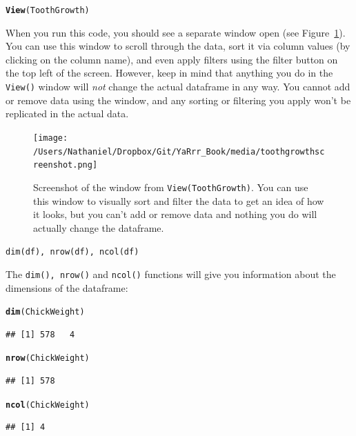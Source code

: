 \documentclass{tufte-book}\usepackage[]{graphicx}\usepackage[]{color}
\makeatletter
\newcommand{\hlstd}[1]{\textcolor[rgb]{0.345,0.345,0.345}{#1}}%
\newcommand{\hlkwd}[1]{\textcolor[rgb]{0.737,0.353,0.396}{\textbf{#1}}}%
\newenvironment{kframe}{%
 \def\at@end@of@kframe{}%
 \ifinner\ifhmode%
  \def\at@end@of@kframe{\end{minipage}}%
  \begin{minipage}{\columnwidth}%
 \fi\fi%
 \def\FrameCommand##1{\hskip\@totalleftmargin \hskip-\fboxsep
 \colorbox{shadecolor}{##1}\hskip-\fboxsep
     \hskip-\linewidth \hskip-\@totalleftmargin \hskip\columnwidth}%
 \MakeFramed {\advance\hsize-\width
   \@totalleftmargin\z@ \linewidth\hsize
   \@setminipage}}%
 {\par\unskip\endMakeFramed%
 \at@end@of@kframe}
\newenvironment{knitrout}{}{} %
\newcommand{\newfun}[1]{\begin{LARGE} \begin{center} \texttt{#1} \end{center} \end{LARGE}}
\makeatother
\begin{document}
\begin{knitrout}
\color{fgcolor}\begin{kframe}
\begin{alltt}
\hlkwd{View}\hlstd{(ToothGrowth)}
\end{alltt}
\end{kframe}
\end{knitrout}

When you run this code, you should see a separate window open (see Figure~\ref{fig:toothgrowthscreenshot}). You can use this window to scroll through the data, sort it via column values (by clicking on the column name), and even apply filters using the filter button on the top left of the screen. However, keep in mind that anything you do in the \texttt{View()} window will \textit{not} change the actual dataframe in any way. You cannot add or remove data using the window, and any sorting or filtering you apply won't be replicated in the actual data.

\begin{figure}[h]
\texttt{[image: /Users/Nathaniel/Dropbox/Git/YaRrr\_Book/media/toothgrowthscreenshot.png]}
\label{fig:toothgrowthscreenshot}
\caption{Screenshot of the window from \texttt{View(ToothGrowth)}. You can use this window to visually sort and filter the data to get an idea of how it looks, but you can't add or remove data and nothing you do will actually change the dataframe.}
\end{figure}


\newfun{dim(df), nrow(df), ncol(df)}

The \texttt{dim(), nrow()} and \texttt{ncol()} functions will give you information about the dimensions of the dataframe:
\begin{knitrout}
\color{fgcolor}\begin{kframe}
\begin{alltt}
\hlkwd{dim}\hlstd{(ChickWeight)}
\end{alltt}
\begin{verbatim}
## [1] 578   4
\end{verbatim}
\begin{alltt}
\hlkwd{nrow}\hlstd{(ChickWeight)}
\end{alltt}
\begin{verbatim}
## [1] 578
\end{verbatim}
\begin{alltt}
\hlkwd{ncol}\hlstd{(ChickWeight)}
\end{alltt}
\begin{verbatim}
## [1] 4
\end{verbatim}
\end{kframe}
\end{knitrout}
\end{document}
